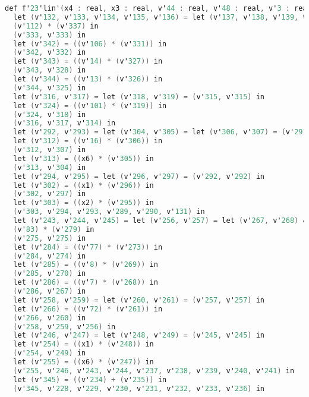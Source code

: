 \documentclass[a4paper, french, 11pt]{article}
\begin{document}
\begin{lstlisting}[style=myStyle, language=C]
def f'23'lin'(x4 : real, x3 : real, v'44 : real, v'48 : real, v'3 : real, v'4 : real, v'54 : real, v'60 : real, x6 : real, x1 : real, v'72 : real, v'7 : real, v'8 : real, v'77 : real, v'83 : real, x2 : real, v'16 : real, v'101 : real, v'13 : real, v'14 : real, v'106 : real, v'112 : real, v'131 : real, v'130 : real) = 
  let (v'132, v'133, v'134, v'135, v'136) = let (v'137, v'138, v'139, v'140, v'141, v'142) = let (v'143, v'144, v'145, v'146, v'147, v'148, v'149) = let (v'150, v'151, v'152, v'153, v'154, v'155) = let (v'166, v'167, v'168, v'169, v'170, v'171, v'172) = let (v'173, v'174, v'175, v'176, v'177, v'178) = let (v'213, v'214, v'215, v'216, v'217, v'218, v'219) = let (v'220, v'221, v'222, v'223, v'224, v'225, v'226, v'227) = let (v'228, v'229, v'230, v'231, v'232, v'233, v'234, v'235, v'236) = let (v'237, v'238, v'239, v'240, v'241, v'242) = let (v'289, v'290, v'291) = let (v'314, v'315) = let (v'325, v'326) = let (v'327, v'328) = let (v'331, v'332) = let (v'333) = let (v'337) = (v'130) in 
  (v'112) * (v'337) in 
  (v'333, v'333) in 
  let (v'342) = ((v'106) * (v'331)) in 
  (v'342, v'332) in 
  let (v'343) = ((v'14) * (v'327)) in 
  (v'343, v'328) in 
  let (v'344) = ((v'13) * (v'326)) in 
  (v'344, v'325) in 
  let (v'316, v'317) = let (v'318, v'319) = (v'315, v'315) in 
  let (v'324) = ((v'101) * (v'319)) in 
  (v'324, v'318) in 
  (v'316, v'317, v'314) in 
  let (v'292, v'293) = let (v'304, v'305) = let (v'306, v'307) = (v'291, v'291) in 
  let (v'312) = ((v'16) * (v'306)) in 
  (v'312, v'307) in 
  let (v'313) = ((x6) * (v'305)) in 
  (v'313, v'304) in 
  let (v'294, v'295) = let (v'296, v'297) = (v'292, v'292) in 
  let (v'302) = ((x1) * (v'296)) in 
  (v'302, v'297) in 
  let (v'303) = ((x2) * (v'295)) in 
  (v'303, v'294, v'293, v'289, v'290, v'131) in 
  let (v'243, v'244, v'245) = let (v'256, v'257) = let (v'267, v'268) = let (v'269, v'270) = let (v'273, v'274) = let (v'275) = let (v'279) = (v'242) in 
  (v'83) * (v'279) in 
  (v'275, v'275) in 
  let (v'284) = ((v'77) * (v'273)) in 
  (v'284, v'274) in 
  let (v'285) = ((v'8) * (v'269)) in 
  (v'285, v'270) in 
  let (v'286) = ((v'7) * (v'268)) in 
  (v'286, v'267) in 
  let (v'258, v'259) = let (v'260, v'261) = (v'257, v'257) in 
  let (v'266) = ((v'72) * (v'261)) in 
  (v'266, v'260) in 
  (v'258, v'259, v'256) in 
  let (v'246, v'247) = let (v'248, v'249) = (v'245, v'245) in 
  let (v'254) = ((x1) * (v'248)) in 
  (v'254, v'249) in 
  let (v'255) = ((x6) * (v'247)) in 
  (v'255, v'246, v'243, v'244, v'237, v'238, v'239, v'240, v'241) in 
  let (v'345) = ((v'234) + (v'235)) in 
  (v'345, v'228, v'229, v'230, v'231, v'232, v'233, v'236) in 

\end{lstlisting}
\end{document}
